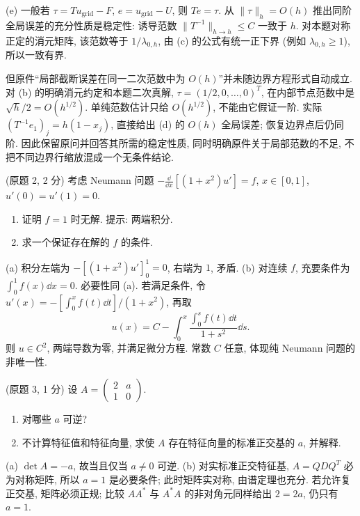 \begin{solution}
(e) 一般若 $\tau=T u_{\mathrm{grid}}-F$, $e=u_{\mathrm{grid}}-U$, 则 $Te=\tau$. 从 $\|\tau\|_h=O(h)$ 推出同阶全局误差的充分性质是稳定性: 诱导范数 $\|T^{-1}\|_{h\to h}\le C$ 一致于 $h$.
对本题对称正定的消元矩阵, 该范数等于 $1/\lambda_{0,h}$, 由 (c) 的公式有统一正下界 (例如 $\lambda_{0,h}\ge1$), 所以一致有界.

但原件“局部截断误差在同一二次范数中为 $O(h)$”并未随边界方程形式自动成立. 对 (b) 的明确消元约定和本题二次真解, $\tau=(1/2,0,\ldots,0)^T$, 在内部节点范数中是 $\sqrt h/2=O(h^{1/2})$. 单纯范数估计只给 $O(h^{1/2})$, 不能由它假证一阶. 实际
$(T^{-1}e_1)_j=h(1-x_j)$, 直接给出 (d) 的 $O(h)$ 全局误差; 恢复边界点后仍同阶. 因此保留原问并回答其所需的稳定性质, 同时明确原件关于局部范数的不足, 不把不同边界行缩放混成一个无条件结论.
\end{solution}

\begin{exercise}\label{ps6-q2}
(原题 2, 2 分) 考虑 Neumann 问题
$-\frac{\dd}{\dd x}[(1+x^2)u']=f$,
$x\in[0,1]$, $u'(0)=u'(1)=0$.
\begin{enumerate}[label=(\alph*)]
\item 证明 $f=1$ 时无解. 提示: 两端积分.
\item 求一个保证存在解的 $f$ 的条件.
\end{enumerate}
\end{exercise}
\begin{solution}
(a) 积分左端为 $-[(1+x^2)u']_0^1=0$, 右端为 $1$, 矛盾.
(b) 对连续 $f$, 充要条件为 $\int_0^1f(x)\dd x=0$.
必要性同 (a). 若满足条件, 令
$u'(x)=-[\int_0^x f(t)\dd t]/(1+x^2)$, 再取
\[
u(x)=C-\int_0^x\frac{\int_0^s f(t)\dd t}{1+s^2}\dd s.
\]
则 $u\in C^2$, 两端导数为零, 并满足微分方程. 常数 $C$ 任意, 体现纯 Neumann 问题的非唯一性.
\end{solution}

\begin{exercise}\label{ps6-q3}
(原题 3, 1 分) 设 $A=\left(\begin{smallmatrix}2&a\\1&0\end{smallmatrix}\right)$.
\begin{enumerate}[label=(\alph*)]
\item 对哪些 $a$ 可逆?
\item 不计算特征值和特征向量, 求使 $A$ 存在特征向量的标准正交基的 $a$, 并解释.
\end{enumerate}
\end{exercise}
\begin{solution}
(a) $\det A=-a$, 故当且仅当 $a\ne0$ 可逆.
(b) 对实标准正交特征基, $A=QDQ^T$ 必为对称矩阵, 所以 $a=1$ 是必要条件; 此时矩阵实对称, 由谱定理也充分.
若允许复正交基, 矩阵必须正规; 比较 $AA^*$ 与 $A^*A$ 的非对角元同样给出 $2=2a$, 仍只有 $a=1$.
\end{solution}
